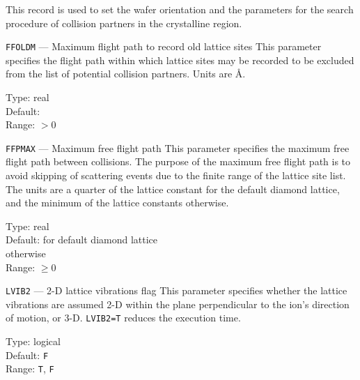 This record is used to set the wafer orientation and the parameters for 
the search procedure of collision partners in the crystalline region. 

\begin{keydescription}{\texttt{FFOLDM} --- Maximum flight path to record old 
lattice sites}
%
This parameter specifies the flight path within which lattice sites may be 
recorded to be excluded from the list of potential collision partners.
Units are \AA.
\begin{keytab}
   Type:    \> real \\
   Default:  \\
   Range:   \> $> 0$
\end{keytab}
\end{keydescription}

\begin{keydescription}{\texttt{FFPMAX} --- Maximum free flight path}
%
This parameter specifies the maximum free flight path between collisions.
The purpose of the maximum free flight path is to avoid skipping of 
scattering events due to the finite range of the lattice site list. The 
units are a quarter of the lattice constant for the default diamond lattice,
and the minimum of the lattice constants otherwise.
\begin{keytab}
   Type:    \> real \\
   Default:  for default diamond lattice \\
             otherwise \\
   Range:   \> $\ge 0$
\end{keytab}
\end{keydescription}

\begin{keydescription}{\texttt{LVIB2} --- 2-D lattice vibrations flag}
%
This parameter specifies whether the lattice vibrations are assumed 2-D
within the plane perpendicular to the ion's direction of motion, or
3-D. \texttt{LVIB2=T} reduces the execution time.
\begin{keytab}
   Type:    \> logical \\
   Default: \> \texttt{F} \\
   Range:   \> \texttt{T}, \texttt{F} 
\end{keytab}
\end{keydescription}

